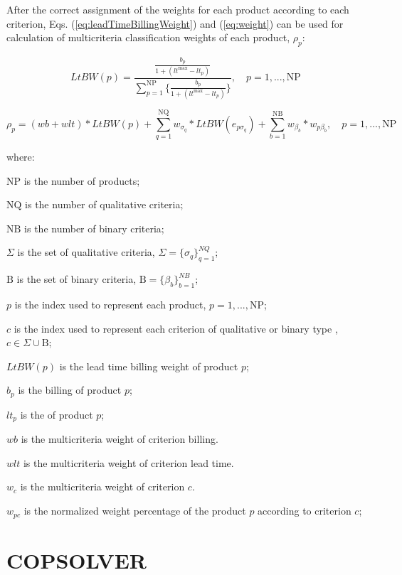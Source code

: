 \documentclass[10pt,fleqn,a4paper,twoside]{article}
\begin{document}
After the correct assignment of the weights for each product according to each criterion, Eqs. (\ref{eq:leadTimeBillingWeight}) and (\ref{eq:weight}) can be used for calculation of multicriteria classification weights of each product, $\rho_{p}$:

\begin{equation}
	\label{eq:leadTimeBillingWeight}
	LtBW(p) = \frac{\frac{b_p}{1 + (lt^{\max} - lt_p)}}{\sum_{p=1}^{\textrm{NP}}{ \{ \frac{b_p}{1 + (lt^{\max} - lt_p)} \} }}, \quad p= 1,...,\textrm{NP}
\end{equation}

\begin{equation}
	\label{eq:weight}
	\rho_{p} = (wb + wlt) * LtBW(p) + \sum_{q=1}^{\textrm{NQ}}{w_{\sigma_q}* LtBW(e_{p\sigma_q})} + \sum_{b=1}^{\textrm{NB}}{w_{\beta_b}*w_{p\beta_b}}, \quad p= 1,...,\textrm{NP}
\end{equation}

where:

$\textrm{NP}$ is the number of products;

$\textrm{NQ}$ is the number of qualitative criteria;

$\textrm{NB}$ is the number of binary criteria;

$\Sigma$ is the set of qualitative criteria, \quad $\Sigma = \{\sigma_q\}_{q=1}^{NQ}$;

$\textrm{B}$ is the set of binary criteria, \quad $\textrm{B} = \{\beta_b\}_{b=1}^{NB}$;

$p$ is the index used to represent each product, \quad $p= 1,...,\textrm{NP}$;

$c$ is the index used to represent each criterion of qualitative or binary type , \quad $c \in \Sigma \cup \textrm{B}$;

$LtBW(p)$ is the lead time billing weight of product $p$;
 
$b_p$ is the billing of product $p$;

$lt_p$ is the of product $p$;

$wb$ is the multicriteria weight of criterion billing.

$wlt$ is the multicriteria weight of criterion lead time.

$w_{c}$ is the multicriteria weight of criterion $c$.

$w_{pc}$ is the normalized weight percentage of the product $p$ according to criterion $c$;

	\section{COPSOLVER}
	
\end{document}
